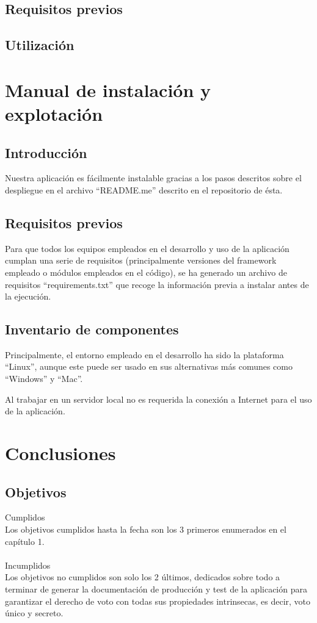 \documentclass[12pt,letterpaper]{report}
\begin{document}
	\subsection{Requisitos previos}
	\subsection{Utilización}

\section{Manual de instalación y explotación}
	\subsection{Introducción}
		Nuestra aplicación es fácilmente instalable gracias a los pasos descritos sobre el despliegue en el archivo “README.me” descrito en el repositorio de ésta.
	\subsection{Requisitos previos}
	Para que todos los equipos empleados en el desarrollo y uso de la aplicación cumplan una serie de requisitos (principalmente versiones del framework empleado o módulos empleados en el código), se ha generado un archivo de requisitos “requirements.txt” que recoge la información previa a instalar antes de la ejecución.
	\subsection{Inventario de componentes}
	Principalmente, el entorno empleado en el desarrollo ha sido la plataforma “Linux”, aunque este puede ser usado en sus alternativas más comunes como “Windows” y “Mac”. 

Al trabajar en un servidor local no es requerida la conexión a Internet para el uso de la aplicación. 

\section{Conclusiones}
	\subsection{Objetivos}
		\noindent Cumplidos\\
		Los objetivos cumplidos hasta la fecha son los 3 primeros enumerados en el capítulo 1.
		\\~\\
		\noindent Incumplidos\\
		Los objetivos no cumplidos son solo los 2 últimos, dedicados sobre todo a terminar de generar la
		documentación de producción y test de la aplicación para garantizar el derecho de voto con todas
		sus propiedades intrinsecas, es decir, voto único y secreto.
\end{document}
